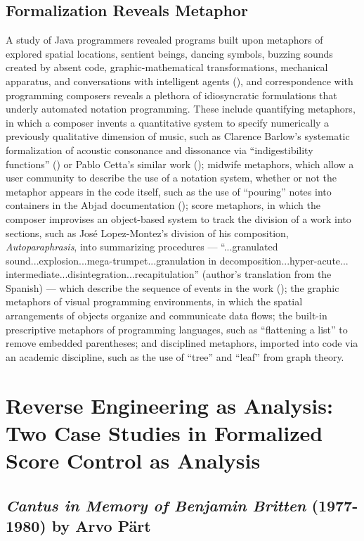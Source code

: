 \subsection{Formalization Reveals Metaphor}
A study of Java programmers revealed programs built upon metaphors of explored spatial locations, sentient beings, dancing symbols, buzzing sounds created by absent code, graphic-mathematical transformations, mechanical apparatus, and conversations with intelligent agents (\cite{blackwell2006metaphors}), and correspondence with programming composers reveals a plethora of idiosyncratic formulations that underly automated notation programming. These include quantifying metaphors, in which a composer invents a quantitative system to specify numerically a previously qualitative dimension of music, such as Clarence Barlow's systematic formalization of acoustic consonance and dissonance via ``indigestibility functions'' (\cite{Barlow:2011xz}) or Pablo Cetta's similar work (\cite{Cetta:1011jb}); midwife metaphors, which allow a user community to describe the use of a notation system, whether or not the metaphor appears in the code itself, such as the use of ``pouring'' notes into containers in the Abjad documentation (\cite{Baca:2011xi}); score metaphors, in which the composer improvises an object-based system to track the division of a work into sections, such as Jos\'{e} Lopez-Montez's division of his composition, \emph{Autoparaphrasis}, into summarizing procedures --- ``...granulated sound...explosion...mega-trumpet...granulation in decomposition...hyper-acute... intermediate...disintegration...recapitulation'' (author's translation from the Spanish) --- which describe the sequence of events in the work (\cite{Lopez-Montes:2011mq}); the graphic metaphors of visual programming environments, in which the spatial arrangements of objects organize and communicate data flows; the built-in prescriptive metaphors of programming languages, such as ``flattening a list'' to remove embedded parentheses; and disciplined metaphors, imported into code via an academic discipline, such as the use of ``tree'' and ``leaf'' from graph theory.

\section{Reverse Engineering as Analysis: Two Case Studies in Formalized Score Control as Analysis}
\subsection{\emph{Cantus in Memory of Benjamin Britten} (1977-1980) by Arvo P\"{a}rt}
